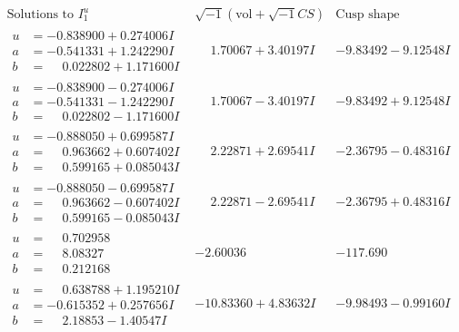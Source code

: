 \documentclass[1p]{elsarticle_modified}
\theoremstyle{definition}
\newcommand{\I}{\sqrt{-1}}
\begin{document}
$$\begin{array}{c|c|c}  
\text{Solutions to }I^u_{1}& \I (\text{vol} + \sqrt{-1}CS) & \text{Cusp shape}\\
 \hline 
\begin{aligned}
u &= -0.838900 + 0.274006 I \\
a &= -0.541331 + 1.242290 I \\
b &= \phantom{-}0.022802 + 1.171600 I\end{aligned}
 & \phantom{-}1.70067 + 3.40197 I & -9.83492 - 9.12548 I \\ \hline\begin{aligned}
u &= -0.838900 - 0.274006 I \\
a &= -0.541331 - 1.242290 I \\
b &= \phantom{-}0.022802 - 1.171600 I\end{aligned}
 & \phantom{-}1.70067 - 3.40197 I & -9.83492 + 9.12548 I \\ \hline\begin{aligned}
u &= -0.888050 + 0.699587 I \\
a &= \phantom{-}0.963662 + 0.607402 I \\
b &= \phantom{-}0.599165 + 0.085043 I\end{aligned}
 & \phantom{-}2.22871 + 2.69541 I & -2.36795 - 0.48316 I \\ \hline\begin{aligned}
u &= -0.888050 - 0.699587 I \\
a &= \phantom{-}0.963662 - 0.607402 I \\
b &= \phantom{-}0.599165 - 0.085043 I\end{aligned}
 & \phantom{-}2.22871 - 2.69541 I & -2.36795 + 0.48316 I \\ \hline\begin{aligned}
u &= \phantom{-}0.702958\phantom{ +0.000000I} \\
a &= \phantom{-}8.08327\phantom{ +0.000000I} \\
b &= \phantom{-}0.212168\phantom{ +0.000000I}\end{aligned}
 & -2.60036\phantom{ +0.000000I} & -117.690\phantom{ +0.000000I} \\ \hline\begin{aligned}
u &= \phantom{-}0.638788 + 1.195210 I \\
a &= -0.615352 + 0.257656 I \\
b &= \phantom{-}2.18853 - 1.40547 I\end{aligned}
 & -10.83360 + 4.83632 I & -9.98493 - 0.99160 I \\ \hline\begin{aligned}

\end{aligned}
\end{array}$$
\end{document}
